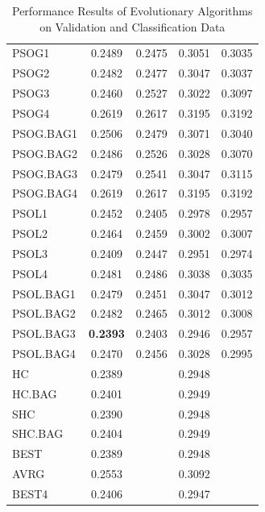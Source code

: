 \begin{table}[ht]
\begin{tabular}{lcccc}
		PSOG1 & 0.2489 & 0.2475 & 0.3051 & 0.3035 \\ 
		PSOG2 & 0.2482 & 0.2477 & 0.3047 & 0.3037 \\ 
		PSOG3 & 0.2460 & 0.2527 & 0.3022 & 0.3097 \\ 
		PSOG4 & 0.2619 & 0.2617 & 0.3195 & 0.3192 \\ 
		PSOG.BAG1 & 0.2506 & 0.2479 & 0.3071 & 0.3040 \\ 
		PSOG.BAG2 & 0.2486 & 0.2526 & 0.3028 & 0.3070 \\ 
		PSOG.BAG3 & 0.2479 & 0.2541 & 0.3047 & 0.3115 \\ 
		PSOG.BAG4 & 0.2619 & 0.2617 & 0.3195 & 0.3192 \\ 
		PSOL1 & 0.2452 & 0.2405 & 0.2978 & 0.2957 \\ 
		PSOL2 & 0.2464 & 0.2459 & 0.3002 & 0.3007 \\ 
		PSOL3 & 0.2409 & 0.2447 & 0.2951 & 0.2974 \\ 
		PSOL4 & 0.2481 & 0.2486 & 0.3038 & 0.3035 \\ 
		PSOL.BAG1 & 0.2479 & 0.2451 & 0.3047 & 0.3012 \\ 
		PSOL.BAG2 & 0.2482 & 0.2465 & 0.3012 & 0.3008 \\ 
		PSOL.BAG3 & \textbf{0.2393} & 0.2403 & 0.2946 & 0.2957 \\ 
		PSOL.BAG4 & 0.2470 & 0.2456 & 0.3028 & 0.2995 \\ \hline
		HC & 0.2389 & & 0.2948 & \\ 
		HC.BAG & 0.2401 &  & 0.2949 & \\
		SHC & 0.2390 & & 0.2948 & \\ 
		SHC.BAG & 0.2404 &  & 0.2949 & \\ \hline
		BEST & 0.2389 & & 0.2948 & \\
		AVRG & 0.2553 & & 0.3092 & \\
		BEST4 & 0.2406 & & 0.2947 & \\
		\hline
	\end{tabular}
\caption{Performance Results of Evolutionary Algorithms on Validation and Classification Data}
\label{tbl:perf} 
\end{table}




